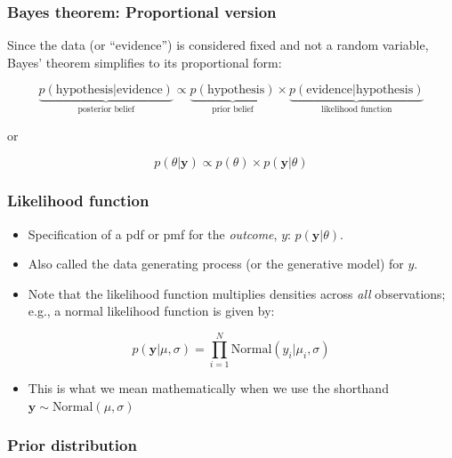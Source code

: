 \documentclass[
  11pt,
]{article}
\providecommand{\tightlist}{%
  \setlength{\itemsep}{0pt}\setlength{\parskip}{0pt}}
\begin{document}
\hypertarget{bayes-theorem-proportional-version}{%
\subsubsection{Bayes theorem: Proportional version}\label{bayes-theorem-proportional-version}}

Since the data (or ``evidence'') is considered fixed and not a random
variable, Bayes' theorem simplifies to its proportional form:

\[
\underbrace{p(\text{hypothesis|evidence})}_{\text{posterior belief}} \propto \underbrace{p(\text{hypothesis})}_{\text{prior belief}} \times \underbrace{p(\text{evidence|hypothesis})}_{\text{likelihood function}}
\]

or

\[
p(\theta | \mathbf{y}) \propto p(\theta) \times p(\mathbf{y}|\theta)
\]

\hypertarget{likelihood-function}{%
\subsubsection{Likelihood function}\label{likelihood-function}}

\begin{itemize}
\tightlist
\item
  Specification of a pdf or pmf for the \emph{outcome}, \(y\):
  \(p(\mathbf{y}|\theta)\).
\item
  Also called the data generating process (or the generative model)
  for \(y\).
\item
  Note that the likelihood function multiplies densities across \emph{all}
  observations; e.g., a normal likelihood function is given by:
\end{itemize}

\[p(\mathbf{y}|\mu, \sigma) = \prod_{i=1}^{N} \text{Normal}\left(y_i | \mu_i, \sigma \right)\]

\begin{itemize}
\tightlist
\item
  This is what we mean mathematically when we use the shorthand
  \(\mathbf{y} \sim \text{Normal}(\mu, \sigma)\)
\end{itemize}

\hypertarget{prior-distribution}{%
\subsubsection{Prior distribution}\label{prior-distribution}}
\end{document}
